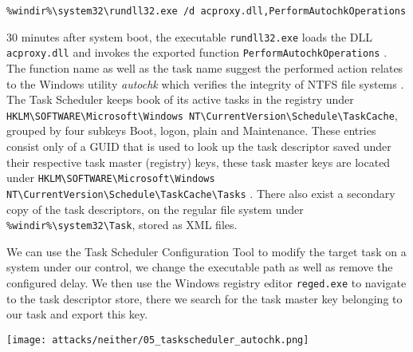 \begin{lstlisting}
%windir%\system32\rundll32.exe /d acproxy.dll,PerformAutochkOperations
\end{lstlisting}

30 minutes after system boot, the executable \lstinline{rundll32.exe} loads the \ac{DLL} \lstinline{acproxy.dll} and invokes the exported function \lstinline{PerformAutochkOperations} \cite{microsoft-rundll32}. The function name as well as the task name suggest the performed action relates to the Windows utility \emph{autochk} which verifies the integrity of \ac{NTFS} file systems \cite{microsoft-autochk}. The Task Scheduler keeps book of its active tasks in the registry under \lstinline{HKLM\SOFTWARE\Microsoft\Windows NT\CurrentVersion\Schedule\TaskCache}, grouped by four subkeys Boot, logon, plain and Maintenance. These entries consist only of a \ac{GUID} that is used to look up the task descriptor saved under their respective task master (registry) keys, these task master keys are located under \lstinline{HKLM\SOFTWARE\Microsoft\Windows NT\CurrentVersion\Schedule\TaskCache\Tasks} \cite[10. The Task Scheduler - Initialization]{windows-internals-7-part2}. There also exist a secondary copy of the task descriptors, on the regular file system under \lstinline{%windir%\system32\Task}, stored as \ac{XML} files.

We can use the Task Scheduler Configuration Tool to modify the target task on a system under our control, we change the executable path as well as remove the configured delay. We then use the Windows registry editor \lstinline{reged.exe} to navigate to the task descriptor store, there we search for the task master key belonging to our task and export this key.

\texttt{[image: attacks/neither/05\_taskscheduler\_autochk.png]}



